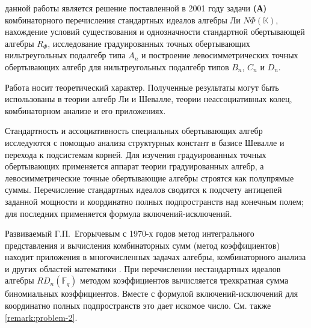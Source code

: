 {\aim} данной работы является решение поставленной в 2001 году задачи
\textbf{(А)} комбинаторного перечисления стандартных идеалов алгебры Ли
$N\Phi(\mathbb{K})$, нахождение условий существования и
однозначности стандартной обертывающей алгебры $R_{\Phi}$,
исследование градуированных точных обертывающих нильтреугольных подалгебр типа
$A_n$ и построение левосимметрических точных обертывающих алгебр для
нильтреугольных подалгебр типов $B_n$, $C_n$ и $D_n$.

{\influence} Работа носит теоретический характер. Полученные результаты могут
быть использованы в теории алгебр Ли и Шевалле, теории неассоциативных колец,
комбинаторном анализе и его приложениях.

{\methods} Стандартность и ассоциативность специальных обертывающих алгебр
исследуются с помощью анализа структурных констант в базисе Шевалле и перехода
к подсистемам корней. Для изучения градуированных точных обертывающих применяется
аппарат теории градуированных алгебр, а левосимметрические точные обертывающие
алгебры строятся как полупрямые суммы. Перечисление стандартных идеалов
сводится к подсчету антицепей заданной мощности и координатно полных
подпространств над конечным полем; для последних применяется формула
включений-исключений.

Развиваемый Г.\:П.~Егорычевым с 1970-х годов метод интегрального представления
и вычисления комбинаторных сумм (метод коэффициентов) находит приложения в
многочисленных задачах алгебры, комбинаторного анализа и других областей
математики \cite{Egorychev77, Eg-2009, Leontiev2001, Riedel-2023, Eg-2013}. При
перечислении нестандартных идеалов алгебры $RD_n(\mathbb{F}_q)$ методом
коэффициентов вычисляется трехкратная сумма биномиальных коэффициентов. Вместе
с формулой включений-исключений для координатно полных подпространств это дает
искомое число.\ifsynopsis\else{} См. также \cref{remark:problem-2}.\fi


